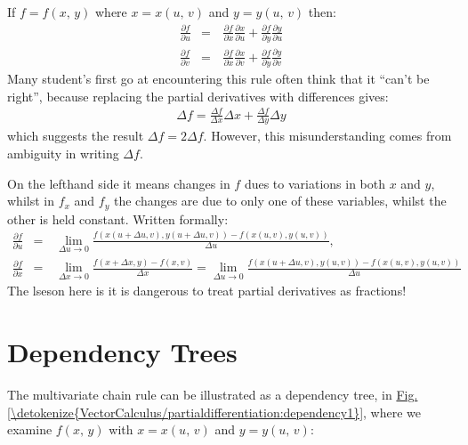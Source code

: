 \documentclass[letterpaper,10pt,english]{jupyterBook}
\begin{document}
\sphinxAtStartPar
If \(f = f(x,\, y)\) where \(x=x(u,\, v)\) and \(y=y(u,\, v)\) then:
\begin{equation*}
\begin{split}\frac{\partial f}{\partial u} &=&\, \frac{\partial f}{\partial x}\frac{\partial x}{\partial u} + \frac{\partial f}{\partial y}\frac{\partial y}{\partial u}\\
\frac{\partial f}{\partial v} &=&\, \frac{\partial f}{\partial x}\frac{\partial x}{\partial v} + \frac{\partial f}{\partial y}\frac{\partial y}{\partial v}\end{split}
\end{equation*}
\sphinxAtStartPar
Many student’s first go at encountering this rule often think that it “can’t be right”, because replacing the partial derivatives with differences gives:
\begin{equation*}
\begin{split}\Delta f = \frac{\Delta f}{\Delta x}\Delta x + \frac{\Delta f}{\Delta y}\Delta y\end{split}
\end{equation*}
\sphinxAtStartPar
which suggests the result \(\Delta f = 2\Delta f\). However, this misunderstanding comes from ambiguity in writing \(\Delta f\).

\sphinxAtStartPar
On the left\sphinxhyphen{}hand side it means changes in \(f\) dues to variations in both \(x\) and \(y\), whilst in \(f_x\) and \(f_y\) the changes are due to only one of these variables, whilst the other
is held constant. Written formally:
\begin{equation*}
\begin{split}\frac{\partial f}{\partial u} &=&\, \lim_{\Delta u\rightarrow 0}\frac{f(x(u+\Delta u,v),y(u+\Delta u,v))-f(x(u,v),y(u,v))}{\Delta u}, \\
\frac{\partial f}{\partial x} &=&\, \lim_{\Delta x\rightarrow 0}\frac{f(x+\Delta x,y)-f(x,v)}{\Delta x}
=\lim_{\Delta u\rightarrow 0}\frac{f(x(u+\Delta u,v),y(u,v))-f(x(u,v),y(u,v))}{\Delta u}\end{split}
\end{equation*}
\sphinxAtStartPar
The lseson here is \sphinxhyphen{} it is dangerous to treat partial derivatives as fractions!


\section{Dependency Trees}
\label{\detokenize{VectorCalculus/partialdifferentiation:dependency-trees}}
\sphinxAtStartPar
The multivariate chain rule can be illustrated as a dependency tree, in \hyperref[\detokenize{VectorCalculus/partialdifferentiation:dependency1}]{Fig.\@ \ref{\detokenize{VectorCalculus/partialdifferentiation:dependency1}}}, where we examine \(f(x,\, y)\) with \(x = x(u,\, v)\) and \(y = y(u,\, v)\):
\end{document}
